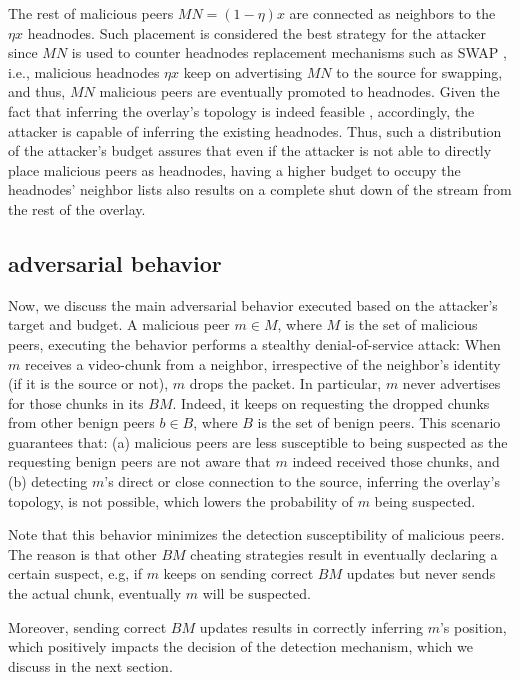 The rest of malicious peers $MN=(1-\eta) x$ are connected as neighbors to the $\eta x$ headnodes. 
Such placement is considered the best strategy for the attacker since $MN$ is used to counter headnodes replacement mechanisms such as SWAP \cite{nguyen2016swap}, i.e., malicious headnodes $\eta x$ keep on advertising $MN$ to the source for swapping, and thus, $MN$ malicious peers are eventually promoted to headnodes. 
Given the fact that inferring the overlay's topology is indeed feasible \cite{nguyen2016swap,rbcs}, accordingly, the attacker is capable of inferring the existing headnodes.
Thus, such a distribution of the attacker's budget assures that even if the attacker is not able to directly place malicious peers as headnodes, having a higher budget to occupy the headnodes' neighbor lists also results on a complete shut down of the stream from the rest of the overlay.



\subsection{\drop adversarial behavior}
Now, we discuss the main adversarial behavior executed based on the attacker's target and budget. 
A malicious peer $m \in M$, where $M$ is the set of malicious peers, executing the \drop behavior performs a stealthy denial-of-service attack: 
When $m$ receives a video-chunk from a neighbor, irrespective of the neighbor's identity (if it is the source or not), $m$ drops the packet.
In particular, $m$ never advertises for those chunks in its $BM$.
Indeed, it keeps on requesting the dropped chunks from other benign peers $b \in B$, where $B$ is the set of benign peers.
This scenario guarantees that: (a) malicious peers are less susceptible to being suspected as the requesting benign peers are not aware that $m$ indeed received those chunks,
and (b) detecting $m$'s direct or close connection to the source, inferring the overlay's topology, is not possible, which lowers the probability of $m$ being suspected.



Note that this behavior minimizes the detection susceptibility of malicious peers.
The reason is that other $BM$ cheating strategies result in eventually declaring a certain suspect, e.g, if $m$ keeps on sending correct $BM$ updates but never sends the actual chunk, eventually $m$ will be suspected.

Moreover, sending correct $BM$ updates results in correctly inferring $m$'s position, which positively impacts the decision of the detection mechanism, which we discuss in the next section. 






